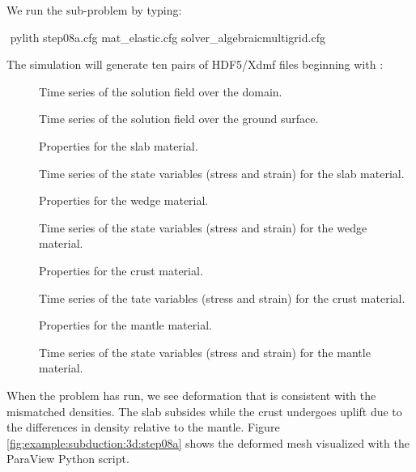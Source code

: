 We run the sub-problem by typing:
\begin{shell}
$$ pylith step08a.cfg mat_elastic.cfg solver_algebraicmultigrid.cfg
\end{shell}
The simulation will generate ten pairs of HDF5/Xdmf files beginning
with :
\begin{description}
\item[] Time series of the solution field over the domain.
\item[] Time series of the solution field over the ground surface.
\item[] Properties for
  the slab material.
\item[] Time series of the state variables (stress and strain) for the slab material.
\item[] Properties for
  the wedge material.
\item[] Time series of the state variables (stress and strain) for the wedge material.
\item[] Properties for
  the crust material.
\item[] Time series of the tate variables
  (stress and strain) for the crust material.
\item[] Properties for
  the mantle material.
\item[] Time series of the state variables
  (stress and strain) for the mantle material.
\end{description}

When the problem has run, we see deformation that is consistent with
the mismatched densities. The slab subsides while the crust undergoes
uplift due to the differences in density relative to the mantle. Figure
\ref{fig:example:subduction:3d:step08a} shows the deformed mesh
visualized with the  ParaView Python
script.

